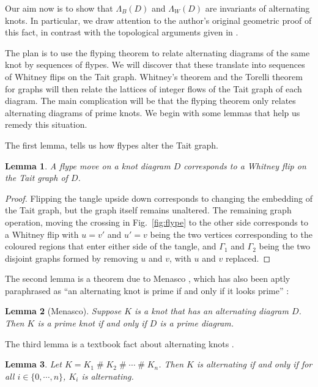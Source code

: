 \documentclass[12pt]{report}
\newcommand{\hash}{\ensuremath{\mathbin{\#}}}
\newtheorem*{lemma}{Lemma}
\theoremstyle{upright}
\begin{document}
Our aim now is to show that $\Lambda_{B}(D)$ and $\Lambda_{W}(D)$ are invariants of alternating knots.  In particular, we draw attention to the author's original geometric proof of this fact, in contrast with the topological arguments given in \cite{lattices-graphs-mutation}.

The plan is to use the flyping theorem to relate alternating diagrams of the same knot by sequences of flypes.  We will discover that these translate into sequences of Whitney flips on the Tait graph. Whitney's theorem and the Torelli theorem for graphs will then relate the lattices of integer flows of the Tait graph of each diagram. The main complication will be that the flyping theorem only relates alternating diagrams of prime knots. We begin with some lemmas that help us remedy this situation.

The first lemma, tells us how flypes alter the Tait graph.

\begin{lemma}
	A flype move on a knot diagram $D$ corresponds to a Whitney flip on the Tait graph of $D$.
\end{lemma}

\begin{proof}
	Flipping the tangle upside down corresponds to changing the embedding of the Tait graph, but the graph itself remains unaltered. The remaining graph operation, moving the crossing in Fig.~\ref{fig:flype} to the other side corresponds to a Whitney flip with $u = v'$ and $u' = v$ being the two vertices corresponding to the coloured regions that enter either side of the tangle, and $\Gamma_{1}$ and $\Gamma_{2}$ being the two disjoint graphs formed by removing $u$ and $v$, with $u$ and $v$ replaced.
\end{proof}


The second lemma is a theorem due to Menasco \cite{closed-incompressible-surfaces}, which has also been aptly paraphrased as ``an alternating knot is prime if and only if it looks prime'' \cite{the-first-two-million-knots}:

\begin{lemma}[Menasco]
	Suppose $K$ is a knot that has an alternating diagram $D$. Then $K$ is a prime knot if and only if $D$ is a prime diagram.
\end{lemma}

The third lemma is a textbook fact about alternating knots \cite{introduction-knot-theory}.

\begin{lemma}
	Let $K = K_{1} \hash K_{2} \hash \cdots \hash K_{n}$. Then $K$ is alternating if and only if for all $i \in \{0, \cdots, n\}$, $K_{i}$ is alternating.
\end{lemma}
\end{document}
